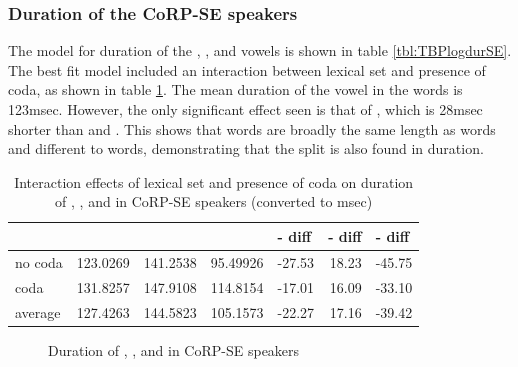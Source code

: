 \documentclass[../../00.FullDoc/tex/Thesis]{subfiles}
\begin{document}
\subsubsection{Duration of the CoRP-SE speakers}

%

The model for duration of the \trap{}, \bath{}, and \palm{} vowels is shown in table \ref{tbl:TBPlogdurSE}. The best fit model included an interaction between lexical set and presence of coda, as shown in table \ref{tbl:TBPdurSE-inter}. The mean duration of the vowel in the \bath{} words is 123msec. However, the only significant effect seen is that of \trap{}, which is 28msec shorter than \palm{} and \bath{}. This shows that \bath{} words are broadly the same length as \palm{} words and different to \trap{} words, demonstrating that the \TB{} split is also found in duration.

\begin{table}[htbp]
	\centering
	\begin{tabular}{lrrrrrr}
		& \multicolumn{1}{l}{\bath{}} & \multicolumn{1}{l}{\palm{}} & \multicolumn{1}{l}{\trap{}} & \multicolumn{1}{l}{\trap{}-\bath{} diff} & \multicolumn{1}{l}{\palm{}-\bath{} diff} & \multicolumn{1}{l}{\trap{}-\palm{} diff} \\
		\hline
		no coda & 123.0269 & 141.2538 & 95.49926 & -27.53 & 18.23 & -45.75 \\
		coda & 131.8257 & 147.9108 & 114.8154 & -17.01 & 16.09 & -33.10 \\
		\hline
		average & 127.4263 & 144.5823 & 105.1573 & -22.27 & 17.16 & -39.42 \\
		\hline
	\end{tabular}%
	\caption{Interaction effects of lexical set and presence of coda on duration of \trap{}, \bath{}, and \palm{} in CoRP-SE speakers (converted to msec)} 
	\label{tbl:TBPdurSE-inter}%
\end{table}%




\begin{figure}[h]
	
	\caption{Duration of \bath{}, \palm{}, and \trap{}  in CoRP-SE speakers} \label{fig:TBPdurSE}
\end{figure}
\end{document}

